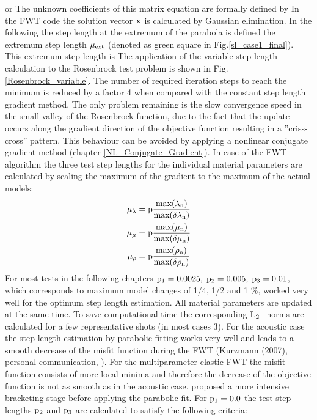 or 
The unknown coefficients of this matrix equation are formally defined by
In the FWT code the solution vector $\rm{\mathbf{x}}$ is calculated by Gaussian elimination. In the following the step length at the extremum of the parabola is defined the extremum step length $\rm{\mu_{ext}}$ (denoted as green square in Fig.\ref{sl_case1_final}). This extremum step length is   
The application of the variable step length calculation to the Rosenbrock test problem is shown in Fig. \ref{Rosenbrock_variable}. The number of required iteration steps to reach the minimum is reduced by a factor 4 when compared with the constant step length gradient method. The only problem remaining is the slow convergence speed in the small valley of the Rosenbrock function, due to the fact that the update occurs along the gradient direction of the objective function resulting in a ''criss-cross'' pattern. This behaviour can be avoided by applying a nonlinear conjugate gradient method (chapter \ref{NL_Conjugate_Gradient}). In case of the FWT algorithm the three test step lengths for the individual material parameters are calculated by scaling the maximum of the gradient to the maximum of the actual models:
\begin{equation}
\begin{split}
\rm{\mu_\lambda} &= \rm{p \frac{max(\lambda_n)}{max(\delta \lambda_n)}}\\
\rm{\mu_\mu} &= \rm{p \frac{max(\mu_n)}{max(\delta \mu_n)}}\\
\rm{\mu_\rho} &= \rm{p \frac{max(\rho_n)}{max(\delta \rho_n)}}\\
\end{split}
\end{equation}
For most tests in the following chapters $\rm{p_1=0.0025,\;p_2=0.005,\;p_3=0.01}$, which corresponds to maximum model changes of 1/4, 1/2 and 1 \%, worked very well for the optimum step length estimation. All material parameters are updated at the same time. To save computational time the corresponding $\rm{L_2}-$norms are calculated for a few representative shots (in most cases 3). For the acoustic case the step length estimation by parabolic fitting works very well and leads to a smooth decrease of the misfit function during the FWT (Kurzmann (2007), personal communication, \cite{kurzmann:08}). For the multiparameter elastic FWT the misfit function consists of more local minima and therefore the decrease of the objective function is not as smooth as in the acoustic case. \cite{brossier:2009} proposed a more intensive bracketing stage before applying the parabolic fit. For $\rm{p_1=0.0}$ the test step lengths $\rm{p_2}$ and $\rm{p_3}$ are calculated to satisfy the following criteria:

